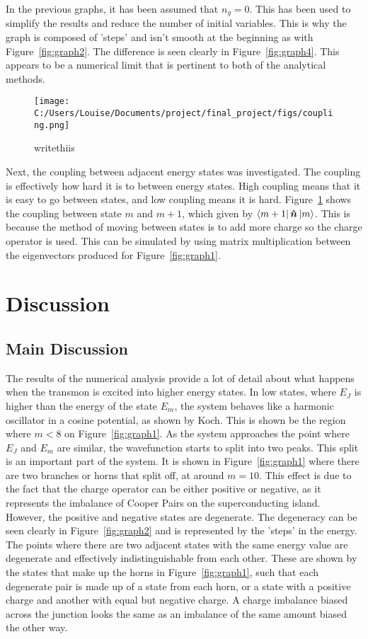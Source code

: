 \documentclass[11pt]{article}
\begin{document}
In the previous graphs, it has been assumed that $n_g = 0$. This has been used to simplify the results and reduce the number of initial variables. This is why the graph is composed of 'steps' and isn't smooth at the beginning as with Figure~\ref{fig:graph2}. The difference is seen clearly in Figure~\ref{fig:graph4}. This appears to be a numerical limit that is pertinent to both of the analytical methods.

\begin{figure}[ht]
\centering
\texttt{[image: C:/Users/Louise/Documents/project/final\_project/figs/coupling.png]}
\caption{writethiis}
\label{fig:graph5}
\end{figure}
Next, the coupling between adjacent energy states was investigated. The coupling is effectively how hard it is to between energy states. High coupling means that it is easy to go between states, and low coupling means it is hard. Figure~\ref{fig:graph5} shows the coupling between state $m$ and $m+1$, which given by $\bra{m+1}\boldsymbol{\hat{n}}\ket{m}$. This is because the method of moving between states is to add more charge so the charge operator is used. This can be simulated by using matrix multiplication between the eigenvectors produced for Figure~\ref{fig:graph1}.

\section{Discussion}
\subsection{Main Discussion}
The results of the numerical analysis provide a lot of detail about what happens when the transmon is excited into higher energy states. In low states, where $E_J$ is higher than the energy of the state $E_m$, the system behaves like a harmonic oscillator in a cosine potential, as shown by Koch. This is shown be the region where $m<8$ on Figure~\ref{fig:graph1}. As the system approaches the point where $E_J$ and $E_m$ are similar, the wavefunction starts to split into two peaks. This split is an important part of the system. It is shown in Figure~\ref{fig:graph1} where there are two branches or horns that split off, at around $m=10$. This effect is due to the fact that the charge operator can be either positive or negative, as it represents the imbalance of Cooper Pairs on the superconducting island. However, the positive and negative states are degenerate. The degeneracy can be seen clearly in Figure~\ref{fig:graph2} and is represented by the 'steps' in the energy. The points where there are two adjacent states with the same energy value are degenerate and effectively indistinguishable from each other. These are shown by the states that make up the horns in Figure~\ref{fig:graph1}, such that each degenerate pair is made up of a state from each horn, or a state with a positive charge and another with equal but negative charge. A charge imbalance biased across the junction looks the same as an imbalance of the same amount biased the other way.
\end{document}
